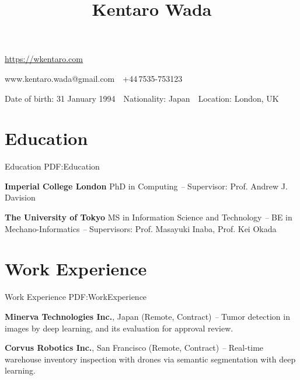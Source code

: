 \documentclass[letterpaper,MMMyyyy,nonstop]{simpleresumecv}
\newcommand{\CVAuthor}{Kentaro Wada}
\newcommand{\CVWebpage}{\href{https://wkentaro.com}{\underline{https://wkentaro.com}}}
\begin{document}

\title{\CVAuthor}

\begin{subtitle}
\CVWebpage
\par
www.kentaro.wada@gmail.com
\,\SubBulletSymbol\,
+44\,7535-753123
\par
Date of birth: 31 January 1994
\,\SubBulletSymbol\,
Nationality: Japan
\,\SubBulletSymbol\,
Location: London, UK

\noindent\makebox[\linewidth]{\rule{0.8\paperwidth}{0.4pt}}
\end{subtitle}

\begin{body}


\section
{Education}
{Education}
{PDF:Education}

\textbf{Imperial College London}
\newline
PhD in Computing
\hfill
{\it {} -- }
\newline
Supervisor: Prof. Andrew J. Davision

\GapNoBreak

\textbf{The University of Tokyo}
\newline
MS in Information Science and Technology
\hfill
{\it {} -- }
\newline
BE in Mechano-Informatics
\hfill
{\it {} -- }
\newline
Supervisors: Prof. Masayuki Inaba, Prof. Kei Okada



\section
{Work Experience}
{Work Experience}
{PDF:WorkExperience}

\textbf{Minerva Technologies Inc.}, Japan (Remote, Contract)
\hfill
\textit{ -- }
\newline
Tumor detection in images by deep learning, and its evaluation for approval review.

\textbf{Corvus Robotics Inc.}, San Francisco (Remote, Contract)
\hfill
\textit{ -- }
\newline
Real-time warehouse inventory inspection with drones via semantic segmentation with deep learning.


\end{body}
\end{document}
